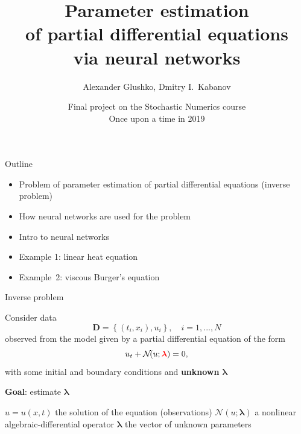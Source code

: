 \documentclass{beamer}
\title{Parameter estimation\\of partial differential equations\\via neural networks}
\author{Alexander Glushko, Dmitry I.\ Kabanov}
\institute{RWTH Aachen University}
\date{Final project on the Stochastic Numerics course\\Once upon a time in 2019}
\def\\{}%
\renewcommand{\vec}[1]{\boldsymbol{#1}}
\newcommand{\VLambda}{\ensuremath{\vec{\lambda}}}
\newcommand{\NonlinOp}{\mathcal N\!}
\begin{document}
\maketitle

\begin{frame}{Outline}
\begin{itemize}
    \item Problem of parameter estimation of partial differential equations
          (inverse problem)
    \item How neural networks are used for the problem
    \item Intro to neural networks
    \item Example 1: linear heat equation
    \item Example~2: viscous Burger's equation
\end{itemize}
\end{frame}

\begin{frame}{Inverse problem}

Consider data
\[
    \vec{D} = \left\{(t_i, x_i), u_i\right\}, \quad i = 1, ..., N
\]
observed from the
model given by a partial differential equation of the form
\begin{equation*}
    \label{eq:pde}
    u_t + \mathcal N\!(u; {\color{red}\VLambda}) = 0,
\end{equation*}
with some initial and boundary conditions and \textbf{unknown} {\color{red}$\VLambda$}

{
\vspace{0.5cm}
\centering
\textbf{Goal}: estimate {\color{red}$\VLambda$}\par
}

\vspace{0.5cm}
$u=u(x, t)$ the solution of the equation (observations)\\
$\NonlinOp(u; \VLambda)$ a nonlinear algebraic-differential operator \\
$\VLambda$ the vector of unknown parameters

\end{frame}
\end{document}
